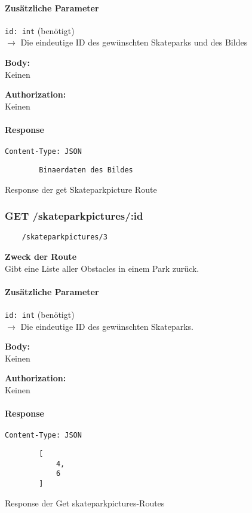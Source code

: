 \paragraph{Zusätzliche Parameter}
\lstinline{id: int} (benötigt) \\
$\rightarrow$ Die eindeutige ID des gewünschten Skateparks und des Bildes


\textbf{Body:} \\
Keinen

\textbf{Authorization:} \\
Keinen

\paragraph{Response }
\begin{code}
    \lstinline{Content-Type: JSON}
    \begin{lstlisting}
        Binaerdaten des Bildes
    \end{lstlisting}
    \caption{Response der get Skateparkpicture Route}
\end{code}
\pagebreak

\subsubsection{GET /skateparkpictures/:id}

\begin{lstlisting}
    /skateparkpictures/3
\end{lstlisting}

\textbf{Zweck der Route} \\
Gibt eine Liste aller Obstacles in einem Park zurück.




\paragraph{Zusätzliche Parameter}
\lstinline{id: int} (benötigt) \\
$\rightarrow$ Die eindeutige ID des gewünschten Skateparks.


\textbf{Body:} \\
Keinen

\textbf{Authorization:} \\
Keinen

\paragraph{Response }
\begin{code}
    \lstinline{Content-Type: JSON}
    \begin{lstlisting}
        [
            4,
            6    
        ]
    \end{lstlisting}
    \caption{Response der Get skateparkpictures-Routes}
\end{code}
